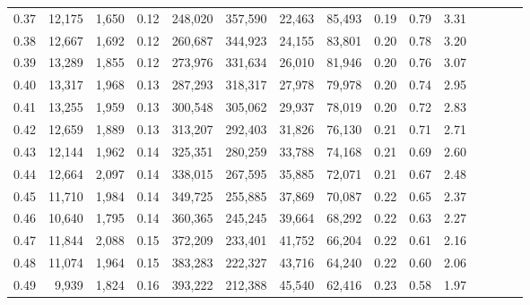 \begin{tabular}{rrrcrrrrrrrrrrr}
0.37 &  12,175 &  1,650 &                                       0.12 &  248,020 &  357,590 &   22,463 &   85,493 &  0.19 &  0.79 &                         3.31 \\
0.38 &  12,667 &  1,692 &                                       0.12 &  260,687 &  344,923 &   24,155 &   83,801 &  0.20 &  0.78 &                         3.20 \\
0.39 &  13,289 &  1,855 &                                       0.12 &  273,976 &  331,634 &   26,010 &   81,946 &  0.20 &  0.76 &                         3.07 \\
0.40 &  13,317 &  1,968 &                                       0.13 &  287,293 &  318,317 &   27,978 &   79,978 &  0.20 &  0.74 &                         2.95 \\
0.41 &  13,255 &  1,959 &                                       0.13 &  300,548 &  305,062 &   29,937 &   78,019 &  0.20 &  0.72 &                         2.83 \\
0.42 &  12,659 &  1,889 &                                       0.13 &  313,207 &  292,403 &   31,826 &   76,130 &  0.21 &  0.71 &                         2.71 \\
0.43 &  12,144 &  1,962 &                                       0.14 &  325,351 &  280,259 &   33,788 &   74,168 &  0.21 &  0.69 &                         2.60 \\
0.44 &  12,664 &  2,097 &                                       0.14 &  338,015 &  267,595 &   35,885 &   72,071 &  0.21 &  0.67 &                         2.48 \\
0.45 &  11,710 &  1,984 &                                       0.14 &  349,725 &  255,885 &   37,869 &   70,087 &  0.22 &  0.65 &                         2.37 \\
0.46 &  10,640 &  1,795 &                                       0.14 &  360,365 &  245,245 &   39,664 &   68,292 &  0.22 &  0.63 &                         2.27 \\
0.47 &  11,844 &  2,088 &                                       0.15 &  372,209 &  233,401 &   41,752 &   66,204 &  0.22 &  0.61 &                         2.16 \\
0.48 &  11,074 &  1,964 &                                       0.15 &  383,283 &  222,327 &   43,716 &   64,240 &  0.22 &  0.60 &                         2.06 \\
0.49 &   9,939 &  1,824 &                                       0.16 &  393,222 &  212,388 &   45,540 &   62,416 &  0.23 &  0.58 &                         1.97 \\

\end{tabular}
